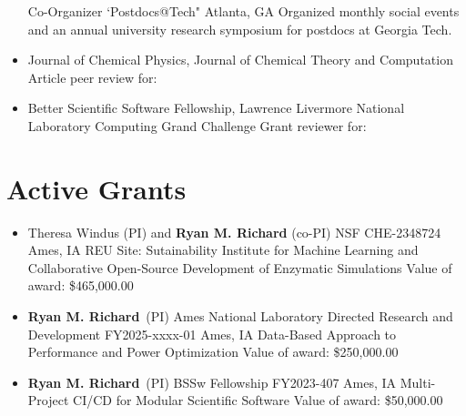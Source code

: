 \documentclass[11pt,a4paper,sans]{moderncv}
\begin{document}
\begin{itemize}
{        {Co-Organizer}
        {`Postdocs@Tech"}
        {Atlanta, GA}
        {}
        {Organized monthly social events and an annual university research 
		 symposium for postdocs at Georgia Tech.}}
	\item{\cventry{}
          {Journal of Chemical Physics, Journal of Chemical Theory and
          Computation}
          {Article peer review for:}
		  {}
          {}
          {}}
    \item{\cventry{}
          	{Better Scientific Software Fellowship, Lawrence Livermore National Laboratory Computing Grand Challenge}
          	{Grant reviewer for:}
          	{}
          	{}
          	{}}
\end{itemize}


\section{Active Grants}
\vspace{5pt}
\begin{itemize}
	\item{
		{Theresa Windus (PI) and \textbf{Ryan M. Richard} (co-PI)}
		{NSF CHE-2348724}
		{Ames, IA}
		{}
		{REU Site: Sutainability Institute for Machine Learning and 
		 Collaborative Open-Source Development of Enzymatic Simulations}
		{Value of award: \$465,000.00}
		{}
	}

	\item{
		{\textbf{Ryan M. Richard}\ (PI)}
		{Ames National Laboratory Directed Research and Development
         FY2025-xxxx-01}
		{Ames, IA}
		{}
		{Data-Based Approach to Performance and Power Optimization}
		{Value of award: \$250,000.00}
		{}
	}
	\item{
		{\textbf{Ryan M. Richard}\ (PI)}
		{BSSw Fellowship FY2023-407}
		{Ames, IA}
		{}
		{Multi-Project CI/CD for Modular Scientific Software}
		{Value of award: \$50,000.00}
		{}
	}
\end{itemize}
\end{document}
